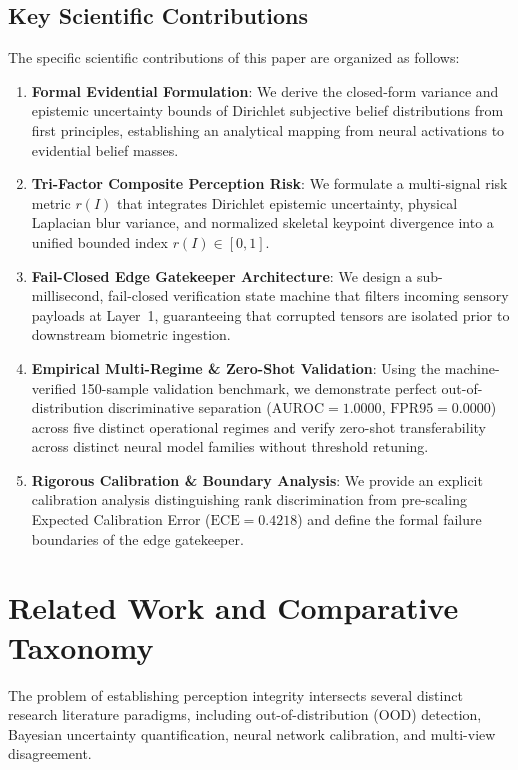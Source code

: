 \documentclass[10pt,journal,compsoc]{IEEEtran}
\begin{document}
\subsection{Key Scientific Contributions}
The specific scientific contributions of this paper are organized as follows:
\begin{enumerate}
    \item \textbf{Formal Evidential Formulation}: We derive the closed-form variance and epistemic uncertainty bounds of Dirichlet subjective belief distributions from first principles, establishing an analytical mapping from neural activations to evidential belief masses.
    \item \textbf{Tri-Factor Composite Perception Risk}: We formulate a multi-signal risk metric $r(I)$ that integrates Dirichlet epistemic uncertainty, physical Laplacian blur variance, and normalized skeletal keypoint divergence into a unified bounded index $r(I) \in [0, 1]$.
    \item \textbf{Fail-Closed Edge Gatekeeper Architecture}: We design a sub-millisecond, fail-closed verification state machine that filters incoming sensory payloads at Layer~1, guaranteeing that corrupted tensors are isolated prior to downstream biometric ingestion.
    \item \textbf{Empirical Multi-Regime & Zero-Shot Validation}: Using the machine-verified 150-sample validation benchmark, we demonstrate perfect out-of-distribution discriminative separation ($\text{AUROC} = 1.0000$, $\text{FPR95} = 0.0000$) across five distinct operational regimes and verify zero-shot transferability across distinct neural model families without threshold retuning.
    \item \textbf{Rigorous Calibration & Boundary Analysis}: We provide an explicit calibration analysis distinguishing rank discrimination from pre-scaling Expected Calibration Error ($\text{ECE} = 0.4218$) and define the formal failure boundaries of the edge gatekeeper.
\end{enumerate}

\section{Related Work and Comparative Taxonomy}
The problem of establishing perception integrity intersects several distinct research literature paradigms, including out-of-distribution (OOD) detection, Bayesian uncertainty quantification, neural network calibration, and multi-view disagreement.
\end{document}
